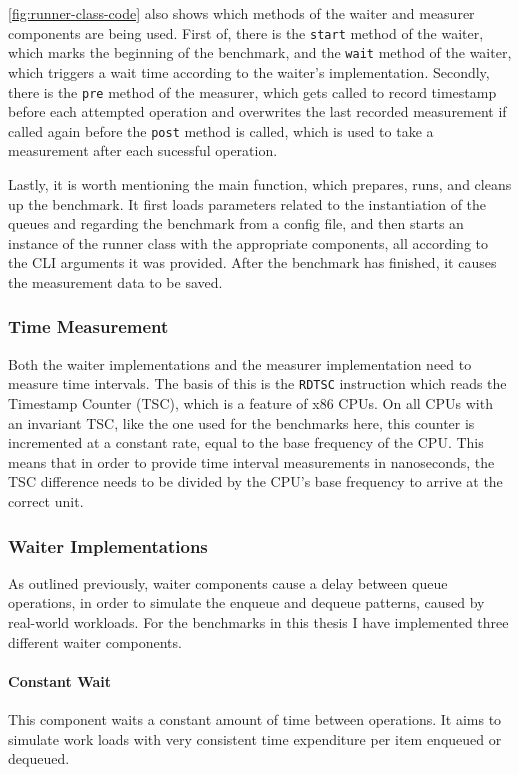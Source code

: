 \autoref{fig:runner-class-code} also shows which methods of the waiter and measurer components are being used.
First of, there is the \texttt{start} method of the waiter, which marks the beginning of the benchmark,
and the \texttt{wait} method of the waiter, which triggers a wait time according to the waiter's implementation.
Secondly, there is the \texttt{pre} method of the measurer, which gets called to record timestamp before each
attempted operation and overwrites the last recorded measurement if called again before the \texttt{post}
method is called, which is used to take a measurement after each sucessful operation.

Lastly, it is worth mentioning the main function, which prepares, runs, and cleans up the benchmark.
It first loads parameters related to the instantiation of the queues and regarding the benchmark from a config file,
and then starts an instance of the runner class with the appropriate components, all according to the CLI
arguments it was provided.
After the benchmark has finished, it causes the measurement data to be saved.

\subsubsection{Time Measurement}
Both the waiter implementations and the measurer implementation need to measure time intervals.
The basis of this is the \texttt{RDTSC} instruction which reads the Timestamp Counter (TSC), which is a
feature of x86 CPUs.
On all CPUs with an invariant TSC, like the one used for the benchmarks here, this counter is incremented at
a constant rate, equal to the base frequency of the CPU.
This means that in order to provide time interval measurements in nanoseconds, the TSC difference needs to be
divided by the CPU's base frequency to arrive at the correct unit.

\subsubsection{Waiter Implementations}
\label{sec:waiter-implementations}
As outlined previously, waiter components cause a delay between queue operations, in order to simulate the
enqueue and dequeue patterns, caused by real-world workloads.
For the benchmarks in this thesis I have implemented three different waiter components.

\paragraph{Constant Wait}
This component waits a constant amount of time between operations.
It aims to simulate work loads with very consistent time expenditure per item enqueued or dequeued.

